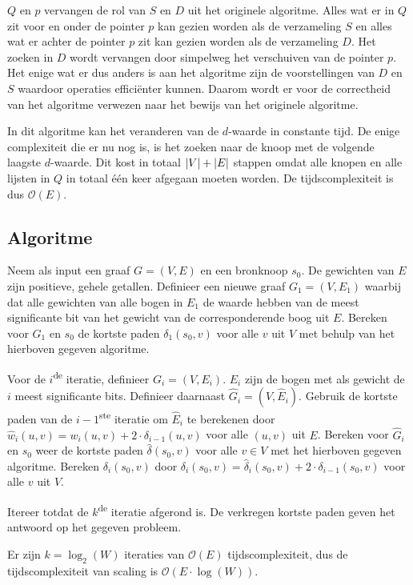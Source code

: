 \documentclass[conference]{IEEEtran}
\theoremstyle{definition}
\theoremstyle{remark}
\DeclarePairedDelimiter{\card}{\vert}{\vert}  %
\begin{document}
$Q$ en $p$ vervangen de rol van $S$ en $D$ uit het originele algoritme. Alles wat er in $Q$ zit voor en onder de pointer $p$ kan gezien worden als de verzameling $S$ en alles wat er achter de pointer $p$ zit kan gezien worden als de verzameling $D$. Het zoeken in $D$ wordt vervangen door simpelweg het verschuiven van de pointer $p$. Het enige wat er dus anders is aan het algoritme zijn de voorstellingen van $D$ en $S$ waardoor operaties efficiënter kunnen. Daarom wordt er voor de correctheid van het algoritme verwezen naar het bewijs van het originele algoritme.

In dit algoritme kan het veranderen van de $d$-waarde in constante tijd. De enige complexiteit die er nu nog is, is het zoeken naar de knoop met de volgende laagste $d$-waarde. Dit kost in totaal $\card{V} + \card{E}$ stappen omdat alle knopen en alle lijsten in $Q$ in totaal één keer afgegaan moeten worden. De tijdscomplexiteit is dus $\mathcal{O}(E)$.

\subsection{Algoritme}
Neem als input een graaf $G = (V, E)$ en een bronknoop $s_0$. De gewichten van $E$ zijn positieve, gehele getallen. Definieer een nieuwe graaf $G_1 = (V, E_1)$ waarbij dat alle gewichten van alle bogen in $E_1$ de waarde hebben van de meest significante bit van het gewicht van de corresponderende boog uit $E$. Bereken voor $G_1$ en $s_0$ de kortste paden $\delta_1(s_0, v)$ voor alle $v$ uit $V$ met behulp van het hierboven gegeven algoritme.

Voor de $i$\textsuperscript{de} iteratie, definieer $G_i = (V, E_i)$. $E_i$ zijn de bogen met als gewicht de $i$ meest significante bits. Definieer daarnaast $\hat{G}_i = (V, \hat{E}_i)$. Gebruik de kortste paden van de $i-1$\textsuperscript{ste} iteratie om $\hat{E}_i$ te berekenen door $\hat{w}_i(u, v) = w_i(u, v) + 2 \cdot \delta_{i-1}(u, v)$ voor alle $(u, v)$ uit $E$. Bereken voor $\hat{G}_i$ en $s_0$ weer de kortste paden $\hat{\delta}(s_0, v)$ voor alle $v \in V$ met het hierboven gegeven algoritme. Bereken $\delta_i(s_0, v)$ door $\delta_i(s_0, v) = \hat{\delta}_i(s_0, v) + 2 \cdot \delta_{i-1}(s_0, v)$ voor alle $v$ uit $V$.

Itereer totdat de $k$\textsuperscript{de} iteratie afgerond is. De verkregen kortste paden geven het antwoord op het gegeven probleem.

Er zijn $k = \log_2(W)$ iteraties van $\mathcal{O}(E)$ tijdscomplexiteit, dus de tijdscomplexiteit van scaling is $\mathcal{O}(E \cdot \log(W))$.
\end{document}
